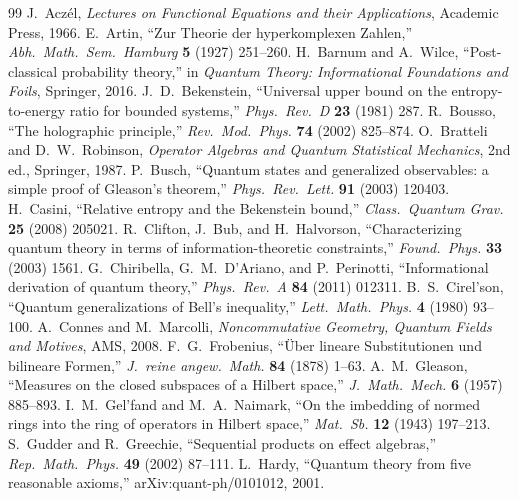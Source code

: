 \documentclass[11pt,a4paper]{article}
\theoremstyle{definition}
\begin{document}
\begin{thebibliography}{99}
 J.~Acz\'el, \textit{Lectures on Functional Equations and their Applications}, Academic Press, 1966.
 E.~Artin, ``Zur Theorie der hyperkomplexen Zahlen,'' \textit{Abh.\ Math.\ Sem.\ Hamburg} \textbf{5} (1927) 251--260.
 H.~Barnum and A.~Wilce, ``Post-classical probability theory,'' in \textit{Quantum Theory: Informational Foundations and Foils}, Springer, 2016.
 J.~D.~Bekenstein, ``Universal upper bound on the entropy-to-energy ratio for bounded systems,'' \textit{Phys.\ Rev.\ D} \textbf{23} (1981) 287.
 R.~Bousso, ``The holographic principle,'' \textit{Rev.\ Mod.\ Phys.} \textbf{74} (2002) 825--874.
 O.~Bratteli and D.~W.~Robinson, \textit{Operator Algebras and Quantum Statistical Mechanics}, 2nd ed., Springer, 1987.
 P.~Busch, ``Quantum states and generalized observables: a simple proof of Gleason's theorem,'' \textit{Phys.\ Rev.\ Lett.} \textbf{91} (2003) 120403.
 H.~Casini, ``Relative entropy and the Bekenstein bound,'' \textit{Class.\ Quantum Grav.} \textbf{25} (2008) 205021.
 R.~Clifton, J.~Bub, and H.~Halvorson, ``Characterizing quantum theory in terms of information-theoretic constraints,'' \textit{Found.\ Phys.} \textbf{33} (2003) 1561.
 G.~Chiribella, G.~M.~D'Ariano, and P.~Perinotti, ``Informational derivation of quantum theory,'' \textit{Phys.\ Rev.\ A} \textbf{84} (2011) 012311.
 B.~S.~Cirel'son, ``Quantum generalizations of Bell's inequality,'' \textit{Lett.\ Math.\ Phys.} \textbf{4} (1980) 93--100.
 A.~Connes and M.~Marcolli, \textit{Noncommutative Geometry, Quantum Fields and Motives}, AMS, 2008.
 F.~G.~Frobenius, ``\"Uber lineare Substitutionen und bilineare Formen,'' \textit{J.\ reine angew.\ Math.} \textbf{84} (1878) 1--63.
 A.~M.~Gleason, ``Measures on the closed subspaces of a Hilbert space,'' \textit{J.\ Math.\ Mech.} \textbf{6} (1957) 885--893.
 I.~M.~Gel'fand and M.~A.~Naimark, ``On the imbedding of normed rings into the ring of operators in Hilbert space,'' \textit{Mat.\ Sb.} \textbf{12} (1943) 197--213.
 S.~Gudder and R.~Greechie, ``Sequential products on effect algebras,'' \textit{Rep.\ Math.\ Phys.} \textbf{49} (2002) 87--111.
 L.~Hardy, ``Quantum theory from five reasonable axioms,'' arXiv:quant-ph/0101012, 2001.

\end{thebibliography}
\end{document}
